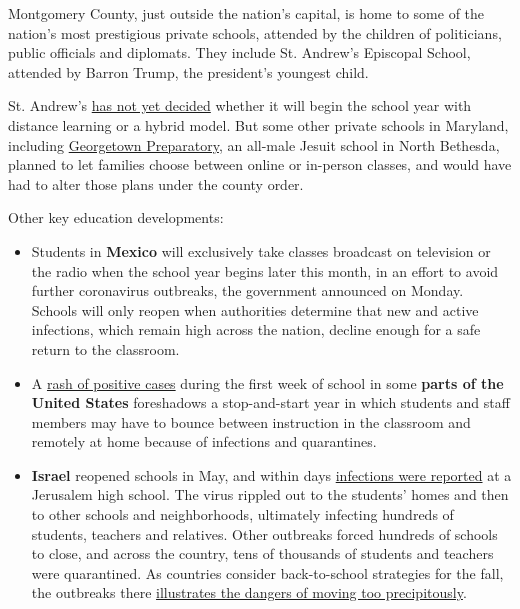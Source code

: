 Montgomery County, just outside the nation's capital, is home to some of
the nation's most prestigious private schools, attended by the children
of politicians, public officials and diplomats. They include St.
Andrew's Episcopal School, attended by Barron Trump, the president's
youngest child.

St. Andrew's \href{https://www.saes.org/covid-19-information}{has not
yet decided} whether it will begin the school year with distance
learning or a hybrid model. But some other private schools in Maryland,
including
\href{https://www.gprep.org/about/news/~post/response-to-the-montgomery-county-health-departments-july-31-directive-20200803}{Georgetown
Preparatory}, an all-male Jesuit school in North Bethesda, planned to
let families choose between online or in-person classes, and would have
had to alter those plans under the county order.

Other key education developments:

\begin{itemize}
\item
  Students in \textbf{Mexico} will exclusively take classes broadcast on
  television or the radio when the school year begins later this month,
  in an effort to avoid further coronavirus outbreaks, the government
  announced on Monday. Schools will only reopen when authorities
  determine that new and active infections, which remain high across the
  nation, decline enough for a safe return to the classroom.
\item
  A
  \href{https://www.nytimes3xbfgragh.onion/2020/08/03/us/school-closing-coronavirus.html}{rash
  of positive cases} during the first week of school in some
  \textbf{parts of the United States} foreshadows a stop-and-start year
  in which students and staff members may have to bounce between
  instruction in the classroom and remotely at home because of
  infections and quarantines.
\item
  \textbf{Israel} reopened schools in May, and within days
  \href{https://www.nytimes3xbfgragh.onion/2020/08/04/world/middleeast/coronavirus-israel-schools-reopen.html}{infections
  were reported} at a Jerusalem high school. The virus rippled out to
  the students' homes and then to other schools and neighborhoods,
  ultimately infecting hundreds of students, teachers and relatives.
  Other outbreaks forced hundreds of schools to close, and across the
  country, tens of thousands of students and teachers were quarantined.
  As countries consider back-to-school strategies for the fall, the
  outbreaks there
  \href{https://www.nytimes3xbfgragh.onion/2020/08/04/world/middleeast/coronavirus-israel-schools-reopen.html}{illustrates
  the dangers of moving too precipitously}.
\end{itemize}

